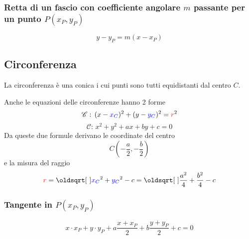 \subsubsection{Retta di un fascio con coefficiente angolare $m$ passante per un punto $P(x_P,y_P)$}
\begin{equation*}
  y-y_P = m(x-x_P)
\end{equation*}

\subsection{Circonferenza}\label{subsec:geomana:circ}
La circonferenza è una conica i cui punti sono tutti equidistanti dal centro $C$.
\begin{center}
\end{center}

Anche le equazioni delle circonferenze hanno 2 forme
\begin{equation*}
  \mathscr{C}:\,(x-\mathcolor{blue}{x_C})^2 + (y-\mathcolor{blue}{y_C})^2 = \mathcolor{red}{r}^2
\end{equation*}
\begin{equation*}
  \mathscr{C}:\,x^2+y^2+ax+by+c =0
\end{equation*}
Da queste due formule derivano le coordinate del centro
\begin{equation*}
  C\left(-\frac{a}{2},-\frac{b}{2}\right)
\end{equation*}
e la misura del raggio
\begin{equation*}
  \mathcolor{red}{r} = \sqrt{\mathcolor{blue}{x_C}^2+\mathcolor{blue}{y_C}^2-c} = 
  \sqrt{\frac{a^2}{4}+\frac{b^2}{4}-c}
\end{equation*}

\subsubsection{Tangente in $P(x_P,y_P)$}
\begin{equation*}
  x\cdot x_P+y\cdot y_P+a\frac{x+x_P}{2}+b\frac{y+y_P}{2}+c = 0
\end{equation*}

